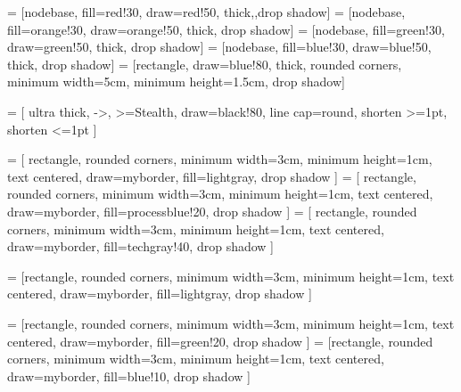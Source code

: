 
 = [nodebase, fill=red!30, draw=red!50, thick,,drop shadow]
 = [nodebase, fill=orange!30, draw=orange!50, thick, drop shadow]
 = [nodebase, fill=green!30, draw=green!50, thick, drop shadow]
 = [nodebase, fill=blue!30, draw=blue!50, thick, drop shadow]
 = [rectangle, draw=blue!80, thick, rounded corners, minimum width=5cm, minimum height=1.5cm, drop shadow]

 = [
    ultra thick,       %
    ->,               %
    >=Stealth,       %
    draw=black!80,    %
    line cap=round,   %
    shorten >=1pt,    %
    shorten <=1pt     %
]



 = [
  rectangle, rounded corners, minimum width=3cm, minimum height=1cm,
  text centered, draw=myborder, fill=lightgray, drop shadow
]
 = [
  rectangle, rounded corners, minimum width=3cm, minimum height=1cm,
  text centered, draw=myborder, fill=processblue!20, drop shadow
]
 = [
  rectangle, rounded corners, minimum width=3cm, minimum height=1cm,
  text centered, draw=myborder, fill=techgray!40, drop shadow
]

 = [rectangle, rounded corners, minimum width=3cm, minimum height=1cm,
   text centered, draw=myborder, fill=lightgray, drop shadow
]

 = [rectangle, rounded corners, minimum width=3cm, minimum height=1cm,
 text centered, draw=myborder, fill=green!20, drop shadow
 ]
 = [rectangle, rounded corners, minimum width=3cm, minimum height=1cm,
 text centered, draw=myborder, fill=blue!10, drop shadow
 ]
